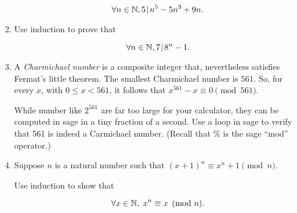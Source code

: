 \documentclass{amsart}
\begin{document}
\begin{enumerate}
\[ \forall n \in {\mathbb N}, 5 \!\mid\! n^5 - 5n^3 + 9n. \]

\vfill

\item Use induction to prove that

\[ \forall n \in {\mathbb N}, 7 \!\mid\! 8^n - 1 . \]

\vfill

\newpage

\item A {\em Charmichael number} is a composite integer that, nevertheless
satisfies Fermat’s little theorem.  The smallest Charmichael number
is $561$.  So, for every $x$, with $0 \leq x < 561$, it follows that $x^{561} - x \equiv 0 \pmod{561}$.

While number like $2^{561}$ are far too large for your calculator, they
can be computed in sage in a tiny fraction of a second.
Use a loop in sage to verify that 561 is indeed a Carmichael
number. (Recall that \% is the sage “mod” operator.)

\vfill

\item Suppose $n$ is a natural number such that $(x+1)^n \equiv  x^n+1 \pmod{n}$.

Use induction to show that

\[ \forall x \in {\mathbb N}, \; x^n  \equiv x \pmod {n}.  \]

\vfill

\end{enumerate}
\end{document}
